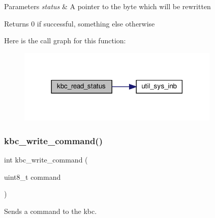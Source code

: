 \begin{DoxyParams}{Parameters}
{\em status} & A pointer to the byte which will be rewritten \\
\hline
\end{DoxyParams}
\begin{DoxyReturn}{Returns}
0 if successful, something else otherwise 
\end{DoxyReturn}
Here is the call graph for this function\+:\nopagebreak
\begin{figure}[H]
\begin{center}
\leavevmode
\includegraphics[width=273pt]{group__kbc_gaa4c58a11cd49c54cc0eb02a79010a9cc_cgraph}
\end{center}
\end{figure}
\mbox{\label{group__kbc_ga8c467e640bc33719fe3ed7bcb73f2121}} 
\subsubsection{\texorpdfstring{kbc\+\_\+write\+\_\+command()}{kbc\_write\_command()}}
{\footnotesize\ttfamily int kbc\+\_\+write\+\_\+command (\begin{DoxyParamCaption}\item[{uint8\+\_\+t}]{command }\end{DoxyParamCaption})}



Sends a command to the kbc. 


